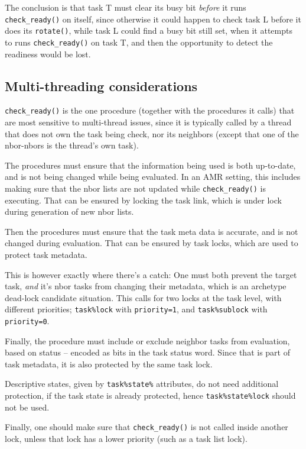 \documentclass[paper=a4,fontsize=11pt]{scrartcl}
\numberwithin{equation}{section}		%
\numberwithin{figure}{section}			%
\numberwithin{table}{section}				%
\newcommand{\codecolor}{\color{Blue}}
\newcommand{\Code}[1]{{\codecolor\texttt{#1}}}
\def\checkready{\Code{check\_ready()}}
\begin{document}
The conclusion is that task T must clear its busy bit \textit{before} it runs \checkready{} on itself, since otherwise it could happen to check task L before it does its \Code{rotate()}, while task L could find a busy bit still set, when it attempts to runs \checkready{} on task T, and then the opportunity to detect the readiness would be lost.

\subsection{Multi-threading considerations}
\checkready{} is the one procedure (together with the procedures it calls) that are most sensitive to multi-thread issues, since it is typically called by a thread that does not own the task being check, nor its neighbors (except that one of the nbor-nbors is the thread's own task).

The procedures must ensure that the information being used is both up-to-date, and is not being changed while being evaluated.   In an AMR setting, this includes making sure that the nbor lists are not updated while \checkready{} is executing.   That can be ensured by locking the task link, which is under lock during generation of new nbor lists.

Then the procedures must ensure that the task meta data is accurate, and is not changed during evaluation.   That can be ensured by task locks, which are used to protect task metadata.

This is however exactly where there's a catch:  One must both prevent the target task, \textit{and}
it's nbor tasks from changing their metadata, which is an archetype dead-lock candidate situation.  This calls for two locks at the task level, with different priorities; \verb|task%lock| with \verb|priority=1|, and \verb|task%sublock| with \verb|priority=0|.

Finally, the procedure must include or exclude neighbor tasks from evaluation, based on status -- encoded as bits in the task status word.  Since that is part of task metadata, it is also protected by the same task lock.

Descriptive states, given by \verb|task%state%| attributes, do not need additional protection, if the task state is already protected, hence \verb|task%state%lock| should not be used.

Finally, one should make sure that \checkready{} is not called inside another lock, unless that lock has a lower priority (such as a task list lock).
\end{document}
